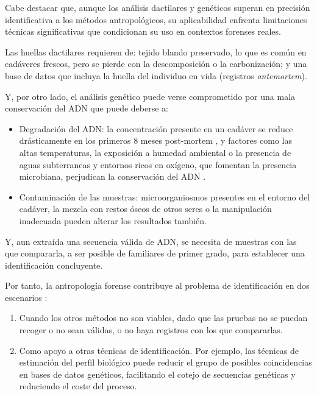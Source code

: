Cabe destacar que, aunque los análisis dactilares y genéticos superan en precisión identificativa a los métodos 
antropológicos, su aplicabilidad enfrenta limitaciones técnicas significativas que condicionan su uso en contextos 
forenses reales.

Las huellas dactilares requieren de: tejido blando preservado, lo que es común en cadáveres frescos, pero se 
pierde con la descomposición o la carbonización; y una base de datos que incluya la huella del individuo en vida 
(registros \textit{antemortem}).

Y, por otro lado, el análisis genético puede verse comprometido por una mala conservación del ADN que puede deberse a:

\begin{itemize}
        
    \item Degradación del ADN: la concentración presente en un cadáver se reduce drásticamente en los primeros 8 
    meses post-mortem \cite{higgins2015}, y factores como las altas temperaturas, la exposición a
    humedad ambiental o la presencia de aguas subterraneas y entornos ricos en oxígeno, que fomentan la presencia 
    microbiana, perjudican la conservación del ADN \cite{latham2018}.

    \item Contaminación de las muestras: microorganiosmos presentes en el entorno del cadáver, la mezcla con restos 
    óseos de otros seres o la manipulación inadecuada pueden alterar los resultados también.

\end{itemize}

Y, aun extraída una secuencia válida de ADN, se necesita de muestras con las que compararla, a ser posible de 
familiares de primer grado, para establecer una identificación concluyente. 


Por tanto, la antropología forense contribuye al problema de identificación en dos escenarios \cite{swganth2010}:  

\begin{enumerate}

    \item Cuando los otros métodos no son viables, dado que las pruebas no se puedan recoger o no sean válidas, o 
    no haya registros con los que compararlas.

    \item Como apoyo a otras técnicas de identificación. Por ejemplo, las técnicas de estimación del perfil 
    biológico puede reducir el grupo de posibles coincidencias en bases de datos genéticos, facilitando el 
    cotejo de secuencias genéticas y reduciendo el coste del proceso.  

\end{enumerate}

